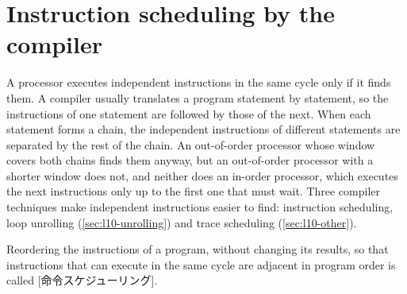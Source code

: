\documentclass[../main.tex]{subfiles}
\begin{document}
\section{Instruction scheduling by the compiler}
\label{sec:l10-scheduling}

A processor executes independent instructions in the same cycle only if it
finds them.  A compiler usually
translates a program statement by statement, so the instructions of one
statement are followed by those of the next.  When each statement forms a
chain, the independent instructions of different statements are separated by
the rest of the chain.  An out-of-order processor whose window covers both
chains finds them anyway, but an out-of-order processor with a shorter window
does not, and neither does an in-order processor, which executes the next
instructions only up to the first one that must wait.  Three compiler
techniques make independent instructions easier to find: instruction
scheduling, loop unrolling (\cref{sec:l10-unrolling}) and trace scheduling
(\cref{sec:l10-other}).

\begin{definition}
  \label{def:l10-scheduling}
  Reordering the instructions of a program, without changing its results, so
  that instructions that can execute in the same cycle are adjacent in program
  order is called [命令スケジューリング].
\end{definition}
\end{document}
